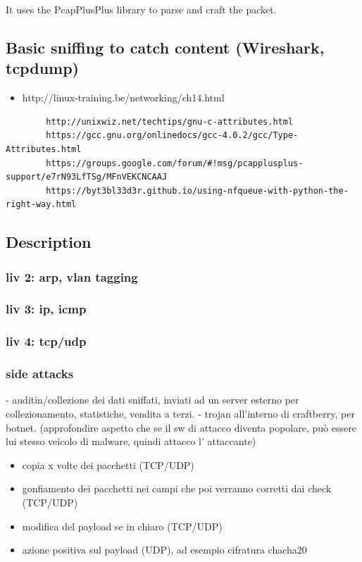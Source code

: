\documentclass[]{article}
\begin{document}
	It uses the PcapPlusPlus library to parse and craft the packet.\\

	\subsection{Basic sniffing to catch content (Wireshark, tcpdump)}
	


	\begin{itemize}
		\item http://linux-training.be/networking/ch14.html
	\end{itemize}

	\begin{verbatim}
		http://unixwiz.net/techtips/gnu-c-attributes.html
		https://gcc.gnu.org/onlinedocs/gcc-4.0.2/gcc/Type-Attributes.html
		https://groups.google.com/forum/#!msg/pcapplusplus-support/e7rN93LfTSg/MFnVEKCNCAAJ
		https://byt3bl33d3r.github.io/using-nfqueue-with-python-the-right-way.html
	\end{verbatim}
			
	\subsection{Description}
		\subsubsection{liv 2: arp, vlan tagging}
		\subsubsection{liv 3: ip, icmp}
		\subsubsection{liv 4: tcp/udp}
		\subsubsection{side attacks}
			- auditin/collezione dei dati sniffati, inviati ad un server esterno per collezionamento, statistiche, vendita a terzi.
			- trojan all'interno di craftberry, per botnet. (approfondire aspetto che se il sw di attacco diventa popolare, può essere lui stesso veicolo di malware, quindi attacco l' attaccante)
		
		\begin{itemize}
			\item copia x volte dei pacchetti (TCP/UDP)
			\item gonfiamento dei pacchetti nei campi che poi verranno corretti dai check (TCP/UDP)
			\item modifica del payload se in chiaro (TCP/UDP)
			\item azione positiva sul payload (UDP), ad esempio cifratura chacha20
		\end{itemize}
\end{document}
